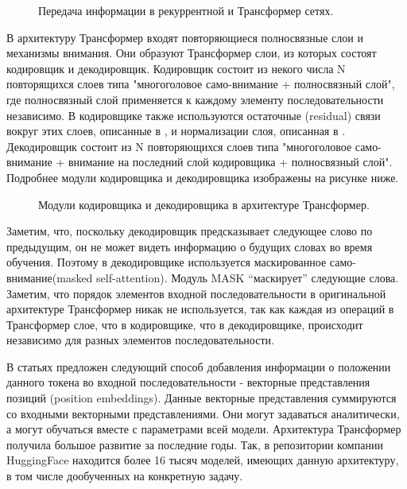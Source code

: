\begin{figure}[ht]
  \caption{Передача информации в рекуррентной и Трансформер сетях.}\label{fig:Transformer3-CompareToRNN}
\end{figure}


В архитектуру Трансформер входят повторяющиеся полносвязные слои и механизмы внимания. Они образуют Трансформер слои, из которых состоят кодировщик и декодировщик. Кодировщик состоит из некого числа N повторящихся слоев типа "многоголовое само-внимание + полносвязный слой", где полносвязный слой применяется к каждому элементу последовательности независимо. В кодировщике также используются остаточные (residual) связи вокруг этих слоев, описанные в \cite{He_Zhang_Ren_Sun_2016}, и нормализации слоя, описанная в \cite{Ba_Kiros_Hinton_2016}.
Декодировщик состоит из N повторяющихся слоев типа "многоголовое само-внимание + внимание на последний слой кодировщика + полносвязный слой". 
 Подробнее модули кодировщика и декодировщика изображены на рисунке ниже. 

\begin{figure}[ht]
  \caption{Модули кодировщика и декодировщика в архитектуре Трансформер.}\label{fig:Transformer4-EncoderDecoder}
\end{figure}


 Заметим, что, поскольку декодировщик предсказывает следующее слово по предыдущим, он не может видеть информацию о будущих словах во время обучения. Поэтому в декодировщике используется маскированное само-внимание(masked self-attention). Модуль MASK “маскирует” следующие слова.
Заметим, что порядок элементов входной последовательности в оригинальной архитектуре Трансформер никак не используется, так как каждая из операций в Трансформер слое, что в кодировщике, что в декодировщике, происходит независимо для разных элементов последовательности. 

В статьях \cite{Devlin_Chang_Lee_Toutanova_2019,Gehring_Auli_Grangier_Yarats_Dauphin_2017,Vaswani_Shazeer_Parmar_Uszkoreit_Jones_Gomez_Kaiser_Polosukhin_2017} предложен следующий способ добавления информации о положении данного токена во входной последовательности - векторные представления позиций (position embeddings). Данные векторные представления суммируются со входными векторными представлениями. Они могут задаваться аналитически, а могут обучаться вместе с параметрами всей модели.
Архитектура Трансформер получила большое развитие за последние годы. Так, в репозитории компании HuggingFace \cite{Hugging Face - Wikipedia} находится более 16 тысяч моделей, имеющих данную архитектуру, в том числе дообученных на конкретную задачу. 

